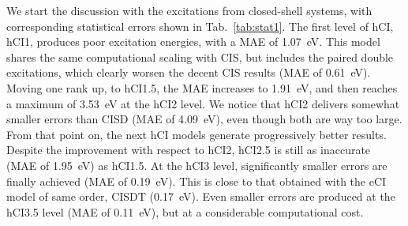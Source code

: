 \documentclass[aip,jcp,reprint,noshowkeys,superscriptaddress]{revtex4-1}
\begin{document}
We start the discussion with the excitations from closed-shell systems, with corresponding statistical errors shown in Tab.~\ref{tab:stat1}.
The first level of hCI, hCI1, produces poor excitation energies, with a MAE of \SI{1.07}{\eV}.
This model shares the same computational scaling with CIS, but includes the paired double excitations, 
which clearly worsen the decent CIS results (MAE of \SI{0.61}{\eV}).
Moving one rank up, to hCI1.5, the MAE increases to \SI{1.91}{\eV}, and then reaches a maximum of \SI{3.53}{\eV} at the hCI2 level.
We notice that hCI2 delivers somewhat smaller errors than CISD (MAE of \SI{4.09}{\eV}), even though both are way too large.
From that point on, the next hCI models generate progressively better results.
Despite the improvement with respect to hCI2, hCI2.5 is still as inaccurate (MAE of \SI{1.95}{\eV}) as hCI1.5.
At the hCI3 level, significantly smaller errors are finally achieved (MAE of \SI{0.19}{\eV}).
This is close to that obtained with the eCI model of same order, CISDT (\SI{0.17}{\eV}).
Even smaller errors are produced at the hCI3.5 level (MAE of \SI{0.11}{\eV}), but at a considerable computational cost.

\end{document}
